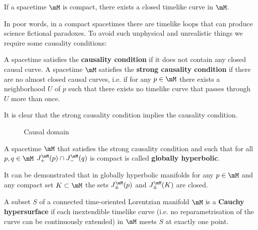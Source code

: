 \begin{prop}
	If a spacetime $\mM$ is compact, there exists a closed timelike curve in $\mM$.
\end{prop}
In poor words, in a compact spacetimes there are timelike loops that can produce science fictional paradoxes. To avoid such unphysical and unrealistic things we require some causality conditions:
\begin{definition}
	A spacetime satisfies the \textbf{causality condition} if it does not contain any closed causal curve. A spacetime $\mM$ satisfies the \textbf{strong causality condition} if there are no almost closed causal curves, i.e. if for any $p\in\mM$ there exists a neighborhood $U$ of $p$ such that there exists no timelike curve that passes through $U$ more than once.
\end{definition}
It is clear that the strong causality condition implies the causality condition.
\begin{figure}
	\centering
	\caption{Causal domain}
\end{figure}
\begin{definition}
	A spacetime $\mM$ that satisfies the strong causality condition and such that for all $p,q\in\mM$ $J_+^{\mM}(p)\cap J_-^{\mM}(q)$ is compact is called \textbf{globally hyperbolic}.
\end{definition}

It can be demonstrated that in globally hyperbolic manifolds for any $p\in\mM$ and any compact set $K\subset\mM$ the sets $J_{\pm}^{\mM}(p)$ and $J_{\pm}^{\mM}(K)$ are closed.

\begin{definition}
	A subset $S$ of a connected time-oriented Lorentzian manifold $\mM$ is a \textbf{Cauchy hypersurface} if each inextendible timelike curve (i.e. no reparametrisation of the curve can be continuously extended) in $\mM$ meets $S$ at exactly one point.
\end{definition}


